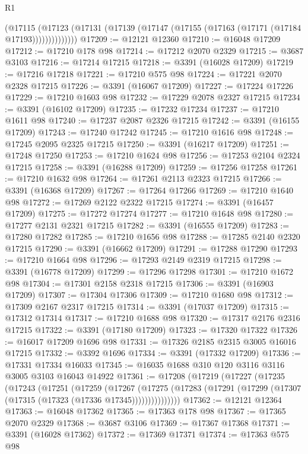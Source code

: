 \begin{lexlean}{R1}
\begin{coremodule}
              (@17115
                (@17123 (@17131 (@17139 (@17147 (@17155 (@17163 (@17171 (@17184 @17193))))))))))))))
@17209 := @12121 @12360
@17210 := @16048 @17209
@17212 := @17210 @178 @98
@17214 := @17212 @2070 @2329
@17215 := @3687 @3103
@17216 := @17214 @17215
@17218 := @3391 (@16028 @17209)
@17219 := @17216 @17218
@17221 := @17210 @575 @98
@17224 := @17221 @2070 @2328 @17215
@17226 := @3391 (@16067 @17209)
@17227 := @17224 @17226
@17229 := @17210 @1603 @98
@17232 := @17229 @2078 @2327 @17215
@17234 := @3391 (@16102 @17209)
@17235 := @17232 @17234
@17237 := @17210 @1611 @98
@17240 := @17237 @2087 @2326 @17215
@17242 := @3391 (@16155 @17209)
@17243 := @17240 @17242
@17245 := @17210 @1616 @98
@17248 := @17245 @2095 @2325 @17215
@17250 := @3391 (@16217 @17209)
@17251 := @17248 @17250
@17253 := @17210 @1624 @98
@17256 := @17253 @2104 @2324 @17215
@17258 := @3391 (@16288 @17209)
@17259 := @17256 @17258
@17261 := @17210 @1632 @98
@17264 := @17261 @2113 @2323 @17215
@17266 := @3391 (@16368 @17209)
@17267 := @17264 @17266
@17269 := @17210 @1640 @98
@17272 := @17269 @2122 @2322 @17215
@17274 := @3391 (@16457 @17209)
@17275 := @17272 @17274
@17277 := @17210 @1648 @98
@17280 := @17277 @2131 @2321 @17215
@17282 := @3391 (@16555 @17209)
@17283 := @17280 @17282
@17285 := @17210 @1656 @98
@17288 := @17285 @2140 @2320 @17215
@17290 := @3391 (@16662 @17209)
@17291 := @17288 @17290
@17293 := @17210 @1664 @98
@17296 := @17293 @2149 @2319 @17215
@17298 := @3391 (@16778 @17209)
@17299 := @17296 @17298
@17301 := @17210 @1672 @98
@17304 := @17301 @2158 @2318 @17215
@17306 := @3391 (@16903 @17209)
@17307 := @17304 @17306
@17309 := @17210 @1680 @98
@17312 := @17309 @2167 @2317 @17215
@17314 := @3391 (@17037 @17209)
@17315 := @17312 @17314
@17317 := @17210 @1688 @98
@17320 := @17317 @2176 @2316 @17215
@17322 := @3391 (@17180 @17209)
@17323 := @17320 @17322
@17326 := @16017 @17209 @1696 @98
@17331 := @17326 @2185 @2315 @3005 @16016 @17215
@17332 := @3392 @1696
@17334 := @3391 (@17332 @17209)
@17336 := @17331 @17334 @16033
@17345 := @16035 @1688 @310 @120 @3116 @3116 @3005 @3103 @16043 @14922
@17361 := @17208
    (@17219
      (@17227
        (@17235
          (@17243
            (@17251
              (@17259
                (@17267
                  (@17275
                    (@17283 (@17291 (@17299 (@17307 (@17315 (@17323 (@17336 @17345)))))))))))))))
@17362 := @12121 @12364
@17363 := @16048 @17362
@17365 := @17363 @178 @98
@17367 := @17365 @2070 @2329
@17368 := @3687 @3106
@17369 := @17367 @17368
@17371 := @3391 (@16028 @17362)
@17372 := @17369 @17371
@17374 := @17363 @575 @98

\end{coremodule}
\end{lexlean}
